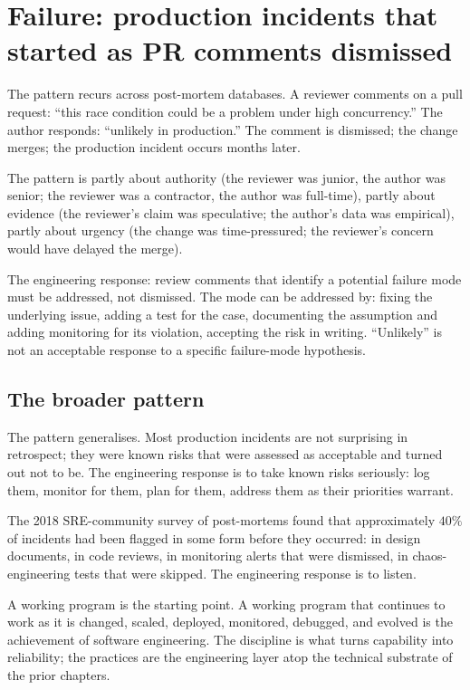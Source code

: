 \section{Failure: production incidents that started as PR comments dismissed}

The pattern recurs across post-mortem databases. A reviewer comments on a pull request: ``this race condition could be a problem under high concurrency.'' The author responds: ``unlikely in production.'' The comment is dismissed; the change merges; the production incident occurs months later.

The pattern is partly about authority (the reviewer was junior, the author was senior; the reviewer was a contractor, the author was full-time), partly about evidence (the reviewer's claim was speculative; the author's data was empirical), partly about urgency (the change was time-pressured; the reviewer's concern would have delayed the merge).

The engineering response: review comments that identify a potential failure mode must be addressed, not dismissed. The mode can be addressed by: fixing the underlying issue, adding a test for the case, documenting the assumption and adding monitoring for its violation, accepting the risk in writing. ``Unlikely'' is not an acceptable response to a specific failure-mode hypothesis.

\subsection{The broader pattern}

The pattern generalises. Most production incidents are not surprising in retrospect; they were known risks that were assessed as acceptable and turned out not to be. The engineering response is to take known risks seriously: log them, monitor for them, plan for them, address them as their priorities warrant.

The 2018 SRE-community survey of post-mortems found that approximately $40\%$ of incidents had been flagged in some form before they occurred: in design documents, in code reviews, in monitoring alerts that were dismissed, in chaos-engineering tests that were skipped. The engineering response is to listen.

\begin{principle}
A working program is the starting point. A working program that continues to work as it is changed, scaled, deployed, monitored, debugged, and evolved is the achievement of software engineering. The discipline is what turns capability into reliability; the practices are the engineering layer atop the technical substrate of the prior chapters.
\end{principle}

